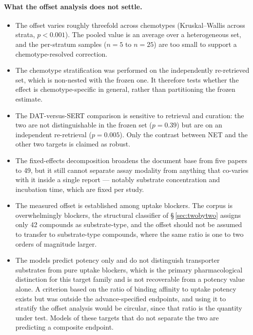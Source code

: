 \documentclass[11pt,a4paper]{article}
\begin{document}
\paragraph{What the offset analysis does not settle.}
\begin{itemize}\setlength\itemsep{0.15em}
\item The offset varies roughly threefold across chemotypes (Kruskal--Wallis across
strata, $p<0.001$). The pooled value is an average over a heterogeneous set, and the
per-stratum samples ($n=5$ to $n=25$) are too small to support a chemotype-resolved
correction.
\item The chemotype stratification was performed on the independently re-retrieved set,
which is non-nested with the frozen one. It therefore tests whether the effect is
chemotype-specific in general, rather than partitioning the frozen estimate.
\item The DAT-versus-SERT comparison is sensitive to retrieval and curation: the two are
not distinguishable in the frozen set ($p=0.39$) but are on an independent re-retrieval
($p=0.005$). Only the contrast between NET and the other two targets is claimed as robust.
\item The fixed-effects decomposition broadens the document base from five papers to 49,
but it still cannot separate assay modality from anything that co-varies with it inside a
single report --- notably substrate concentration and incubation time, which are fixed per
study.
\item The measured offset is established among uptake blockers. The corpus is
overwhelmingly blockers, the structural classifier of \S\,\ref{sec:twobytwo} assigns only
42 compounds as substrate-type, and the offset should not be assumed to transfer to
substrate-type compounds, where the same ratio is one to two orders of magnitude larger.
\item The models predict potency only and do not distinguish transporter substrates from
pure uptake blockers, which is the primary pharmacological distinction for this target
family and is not recoverable from a potency value alone. A criterion based on the ratio
of binding affinity to uptake potency exists \cite{Eshleman2017} but was outside the
advance-specified endpoints, and using it to stratify the offset analysis would be
circular, since that ratio is the quantity under test. Models of these targets that do not
separate the two are predicting a composite endpoint.
\end{itemize}
\end{document}
